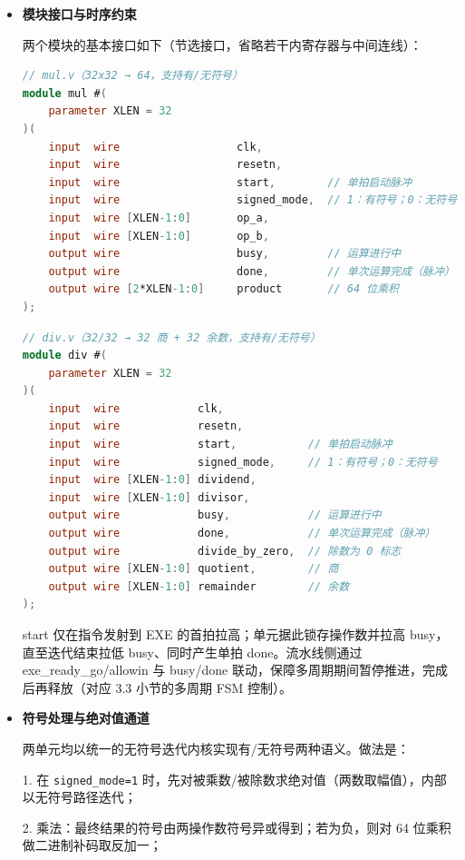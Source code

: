 \documentclass[11pt]{article}
\begin{document}
\begin{itemize}

\item \textbf{模块接口与时序约束} 

两个模块的基本接口如下（节选接口，省略若干内寄存器与中间连线）：
    
\begin{lstlisting}[language=verilog]
// mul.v（32x32 → 64，支持有/无符号）
module mul #(
    parameter XLEN = 32
)(
    input  wire                  clk,
    input  wire                  resetn,
    input  wire                  start,        // 单拍启动脉冲
    input  wire                  signed_mode,  // 1：有符号；0：无符号
    input  wire [XLEN-1:0]       op_a,
    input  wire [XLEN-1:0]       op_b,
    output wire                  busy,         // 运算进行中
    output wire                  done,         // 单次运算完成（脉冲）
    output wire [2*XLEN-1:0]     product       // 64 位乘积
);
\end{lstlisting}
    
\begin{lstlisting}[language=verilog]
// div.v（32/32 → 32 商 + 32 余数，支持有/无符号）
module div #(
    parameter XLEN = 32
)(
    input  wire            clk,
    input  wire            resetn,
    input  wire            start,           // 单拍启动脉冲
    input  wire            signed_mode,     // 1：有符号；0：无符号
    input  wire [XLEN-1:0] dividend,
    input  wire [XLEN-1:0] divisor,
    output wire            busy,            // 运算进行中
    output wire            done,            // 单次运算完成（脉冲）
    output wire            divide_by_zero,  // 除数为 0 标志
    output wire [XLEN-1:0] quotient,        // 商
    output wire [XLEN-1:0] remainder        // 余数
);
\end{lstlisting}
    
start 仅在指令发射到 EXE 的首拍拉高；单元据此锁存操作数并拉高 busy，直至迭代结束拉低 busy、同时产生单拍 done。流水线侧通过 exe\_ready\_go/allowin 与 busy/done 联动，保障多周期期间暂停推进，完成后再释放（对应 3.3 小节的多周期 FSM 控制）。
    
\item \textbf{符号处理与绝对值通道} 
    
两单元均以统一的无符号迭代内核实现有/无符号两种语义。做法是：

1. 在 \texttt{signed\_mode=1} 时，先对被乘数/被除数求绝对值（两数取幅值），内部以无符号路径迭代；

2. 乘法：最终结果的符号由两操作数符号异或得到；若为负，则对 64 位乘积做二进制补码取反加一；


\end{itemize}
\end{document}
